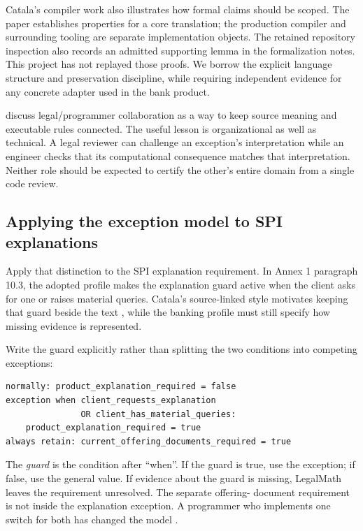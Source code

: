 Catala's compiler work also illustrates how formal claims should be scoped.
The paper establishes properties for a core translation; the production
compiler and surrounding tooling are separate implementation objects. The
retained repository inspection also records an admitted supporting lemma in
the formalization notes. This project has not replayed those proofs. We borrow
the explicit language structure and preservation discipline, while requiring
independent evidence for any concrete adapter used in the bank product.

\citet[sec.~4.2]{huttner2022} discuss legal/programmer collaboration as a way
to keep source meaning and executable rules connected. The useful lesson is
organizational as well as technical. A legal reviewer can challenge an
exception's interpretation while an engineer checks that its computational
consequence matches that interpretation. Neither role should be expected to
certify the other's entire domain from a single code review.

\subsection{Applying the exception model to SPI explanations}
\label{merge:P-01a-language-lesson:02}


Apply that distinction to the SPI explanation requirement. In Annex 1
paragraph 10.3, the adopted profile makes the explanation guard active when the
client asks for one or raises material queries. Catala's source-linked style
motivates keeping that guard beside the text \citep[secs.~2--4]{catala2021},
while the banking profile must still specify how missing evidence is represented.

Write the guard explicitly rather than splitting the two conditions into
competing exceptions:
\begin{lstlisting}[caption={An exception with an explicit guard. The combined guard avoids creating two competing exceptions for the same requirement.}]
normally: product_explanation_required = false
exception when client_requests_explanation
               OR client_has_material_queries:
    product_explanation_required = true
always retain: current_offering_documents_required = true
\end{lstlisting}
The \emph{guard} is the condition after ``when''. If the guard is true, use the
exception; if false, use the general value. If evidence about the guard is
missing, LegalMath leaves the requirement unresolved. The separate offering-
document requirement is not inside the explanation exception. A programmer
who implements one switch for both has changed the model
\citep[Annex 1, para.~10.3]{sfcspiannex1}.

